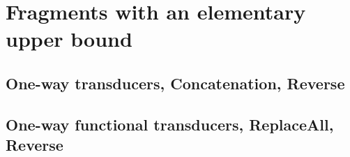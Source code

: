 
\section{Fragments with an elementary upper bound}\label{sec-frag}

\subsection{One-way transducers, Concatenation, Reverse}

\subsection{One-way functional transducers, ReplaceAll, Reverse}